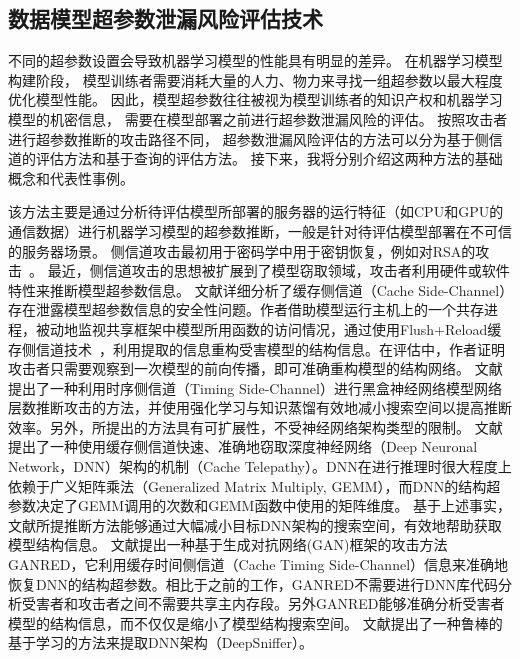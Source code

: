 \subsection{数据模型超参数泄漏风险评估技术}
不同的超参数设置会导致机器学习模型的性能具有明显的差异。
在机器学习模型构建阶段，
模型训练者需要消耗大量的人力、物力来寻找一组超参数以最大程度优化模型性能。
因此，模型超参数往往被视为模型训练者的知识产权和机器学习模型的机密信息，
需要在模型部署之前进行超参数泄漏风险的评估。
按照攻击者进行超参数推断的攻击路径不同，
超参数泄漏风险评估的方法可以分为基于侧信道的评估方法和基于查询的评估方法。
接下来，我将分别介绍这两种方法的基础概念和代表性事例。

该方法主要是通过分析待评估模型所部署的服务器的运行特征（如CPU和GPU的通信数据）进行机器学习模型的超参数推断，一般是针对待评估模型部署在不可信的服务器场景。
侧信道攻击最初用于密码学中用于密钥恢复，例如对RSA的攻击~\cite{Kocher1996TimingAO}。
最近，侧信道攻击的思想被扩展到了模型窃取领域，攻击者利用硬件或软件特性来推断模型超参数信息。
文献{\rm\parencite{DBLP:journals/corr/abs-1810-03487}}详细分析了缓存侧信道（Cache Side-Channel）存在泄露模型超参数信息的安全性问题。作者借助模型运行主机上的一个共存进程，被动地监视共享框架中模型所用函数的访问情况，通过使用Flush+Reload缓存侧信道技术~\cite{Yarom2014FLUSHRELOADAH}，利用提取的信息重构受害模型的结构信息。在评估中，作者证明攻击者只需要观察到一次模型的前向传播，即可准确重构模型的结构网络。
文献{\rm\parencite{DSRB18}}提出了一种利用时序侧信道（Timing Side-Channel）进行黑盒神经网络模型网络层数推断攻击的方法，并使用强化学习与知识蒸馏有效地减小搜索空间以提高推断效率。另外，所提出的方法具有可扩展性，不受神经网络架构类型的限制。
文献{\rm\parencite{DBLP:conf/uss/YanFT20}}提出了一种使用缓存侧信道快速、准确地窃取深度神经网络（Deep Neuronal Network，DNN）架构的机制（Cache Telepathy）。DNN在进行推理时很大程度上依赖于广义矩阵乘法（Generalized Matrix Multiply, GEMM），而DNN的结构超参数决定了GEMM调用的次数和GEMM函数中使用的矩阵维度。
基于上述事实，文献{\rm\parencite{DBLP:conf/uss/YanFT20}}所提推断方法能够通过大幅减小目标DNN架构的搜索空间，有效地帮助获取模型结构信息。
文献{\rm\parencite{Liu2020GANREDGR}}提出一种基于生成对抗网络(GAN)框架的攻击方法GANRED，它利用缓存时间侧信道（Cache Timing Side-Channel）信息来准确地恢复DNN的结构超参数。相比于之前的工作，GANRED不需要进行DNN库代码分析受害者和攻击者之间不需要共享主内存段。另外GANRED能够准确分析受害者模型的结构信息，而不仅仅是缩小了模型结构搜索空间。
文献{\rm\parencite{Hu2020DeepSnifferAD}}提出了一种鲁棒的基于学习的方法来提取DNN架构（DeepSniffer）。
